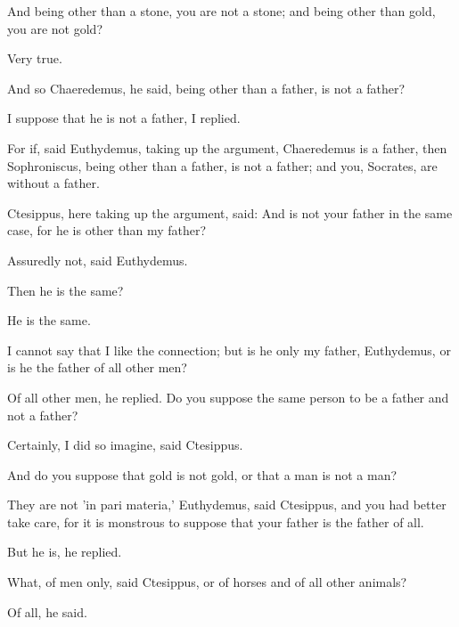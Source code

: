 \documentclass[11pt,letter]{article}
\begin{document}
\par  And being other than a stone, you are not a stone; and being other than gold, you are not gold?

\par  Very true.

\par  And so Chaeredemus, he said, being other than a father, is not a father?

\par  I suppose that he is not a father, I replied.

\par  For if, said Euthydemus, taking up the argument, Chaeredemus is a father, then Sophroniscus, being other than a father, is not a father; and you, Socrates, are without a father.

\par  Ctesippus, here taking up the argument, said: And is not your father in the same case, for he is other than my father?

\par  Assuredly not, said Euthydemus.

\par  Then he is the same?

\par  He is the same.

\par  I cannot say that I like the connection; but is he only my father, Euthydemus, or is he the father of all other men?

\par  Of all other men, he replied. Do you suppose the same person to be a father and not a father?

\par  Certainly, I did so imagine, said Ctesippus.

\par  And do you suppose that gold is not gold, or that a man is not a man?

\par  They are not 'in pari materia,' Euthydemus, said Ctesippus, and you had better take care, for it is monstrous to suppose that your father is the father of all.

\par  But he is, he replied.

\par  What, of men only, said Ctesippus, or of horses and of all other animals?

\par  Of all, he said.
\end{document}
